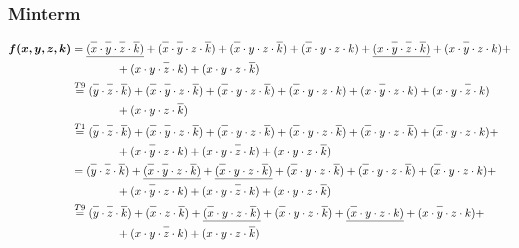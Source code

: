 \documentclass{article}
\newcommand*{\oline}[1]{\overline{#1\mathstrut}}
\newcommand{\bigspace}{\quad\quad\quad\quad}
\begin{document}
\subsubsection*{Minterm}
\begin{align*}
  \bm{f(x,y,z,k)} &= \underline{(\oline{x} \cdot \oline{y} \cdot \oline{z} \cdot \oline{k})} + (\oline{x} \cdot \oline{y} \cdot z \cdot \oline{k}) + (\oline{x} \cdot y \cdot z \cdot \oline{k}) + (\oline{x} \cdot y \cdot z \cdot k) + \underline{(x \cdot \oline{y} \cdot \oline{z} \cdot \oline{k})} + (x \cdot \oline{y} \cdot z \cdot k) + \\
  &\bigspace + (x \cdot y \cdot \oline{z} \cdot k) + (x \cdot y \cdot z \cdot \oline{k})\\
  &\overset{T9}{=} (\oline{y} \cdot \oline{z} \cdot \oline{k}) + (\oline{x} \cdot \oline{y} \cdot z \cdot \oline{k}) + (\oline{x} \cdot y \cdot z \cdot \oline{k}) + (\oline{x} \cdot y \cdot z \cdot k) + (x \cdot \oline{y} \cdot z \cdot k) + (x \cdot y \cdot \oline{z} \cdot k)\\
  &\bigspace + (x \cdot y \cdot z \cdot \oline{k})\\
  &\overset{T1}{=} (\oline{y} \cdot \oline{z} \cdot \oline{k}) + (\oline{x} \cdot \oline{y} \cdot z \cdot \oline{k}) + (\oline{x} \cdot y \cdot z \cdot \oline{k}) + (\oline{x} \cdot y \cdot z \cdot \oline{k}) + (\oline{x} \cdot y \cdot z \cdot \oline{k}) + (\oline{x} \cdot y \cdot z \cdot k) + \\
  &\bigspace + (x \cdot \oline{y} \cdot z \cdot k) + (x \cdot y \cdot \oline{z} \cdot k) + (x \cdot y \cdot z \cdot \oline{k})\\
  &= (\oline{y} \cdot \oline{z} \cdot \oline{k}) + \underline{(\oline{x} \cdot \oline{y} \cdot z \cdot \oline{k})} + \underline{(\oline{x} \cdot y \cdot z \cdot \oline{k})} + (\oline{x} \cdot y \cdot z \cdot \oline{k}) + (\oline{x} \cdot y \cdot z \cdot \oline{k}) + (\oline{x} \cdot y \cdot z \cdot k) + \\
  &\bigspace + (x \cdot \oline{y} \cdot z \cdot k) + (x \cdot y \cdot \oline{z} \cdot k) + (x \cdot y \cdot z \cdot \oline{k})\\
  &\overset{T9}{=} (\oline{y} \cdot \oline{z} \cdot \oline{k}) + (\oline{x} \cdot z \cdot \oline{k}) + \underline{(\oline{x} \cdot y \cdot z \cdot \oline{k})} + (\oline{x} \cdot y \cdot z \cdot \oline{k}) + \underline{(\oline{x} \cdot y \cdot z \cdot k)} + (x \cdot \oline{y} \cdot z \cdot k) + \\
  &\bigspace + (x \cdot y \cdot \oline{z} \cdot k) + (x \cdot y \cdot z \cdot \oline{k})\\

\end{align*}
\end{document}
